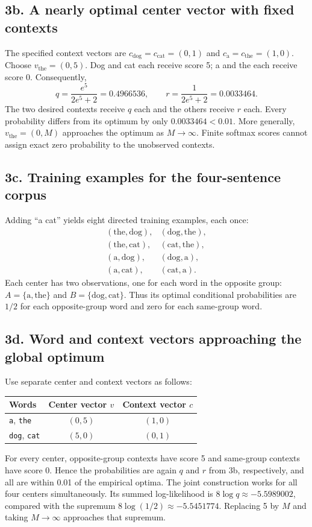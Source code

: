 \documentclass[11pt,letterpaper]{article}
\begin{document}
\subsection*{3b. A nearly optimal center vector with fixed contexts}
The specified context vectors are
$c_{\mathrm{dog}}=c_{\mathrm{cat}}=(0,1)$ and
$c_{\mathrm{a}}=c_{\mathrm{the}}=(1,0)$.
Choose $v_{\mathrm{the}}=(0,5)$. Dog and cat each receive score 5; a and the
each receive score 0. Consequently,
\[
 q=\frac{e^5}{2e^5+2}=0.4966536,\qquad
 r=\frac{1}{2e^5+2}=0.0033464.
\]
The two desired contexts receive $q$ each and the others receive $r$ each.
Every probability differs from its optimum by only $0.0033464<0.01$.
More generally, $v_{\mathrm{the}}=(0,M)$ approaches the optimum as
$M\rightarrow\infty$. Finite softmax scores cannot assign exact zero
probability to the unobserved contexts.

\subsection*{3c. Training examples for the four-sentence corpus}
Adding ``a cat'' yields eight directed training examples, each once:
\[
\begin{array}{ll}
(\text{the},\text{dog}), & (\text{dog},\text{the}),\\
(\text{the},\text{cat}), & (\text{cat},\text{the}),\\
(\text{a},\text{dog}), & (\text{dog},\text{a}),\\
(\text{a},\text{cat}), & (\text{cat},\text{a}).
\end{array}
\]
Each center has two observations, one for each word in the opposite group:
$A=\{\text{a},\text{the}\}$ and $B=\{\text{dog},\text{cat}\}$.
Thus its optimal conditional probabilities are $1/2$ for each opposite-group
word and zero for each same-group word.

\subsection*{3d. Word and context vectors approaching the global optimum}
Use separate center and context vectors as follows:
\begin{center}
\begin{tabular}{lcc}
\toprule
Words & Center vector $v$ & Context vector $c$\\
\midrule
\texttt{a}, \texttt{the} & $(0,5)$ & $(1,0)$\\
\texttt{dog}, \texttt{cat} & $(5,0)$ & $(0,1)$\\
\bottomrule
\end{tabular}
\end{center}
For every center, opposite-group contexts have score 5 and same-group contexts
have score 0. Hence the probabilities are again $q$ and $r$ from 3b, respectively,
and all are within 0.01 of the empirical optima. The joint construction works
for all four centers simultaneously. Its summed log-likelihood is
$8\log q\approx-5.5989002$, compared with the supremum
$8\log(1/2)\approx-5.5451774$. Replacing 5 by $M$ and taking
$M\rightarrow\infty$ approaches that supremum.
\end{document}
